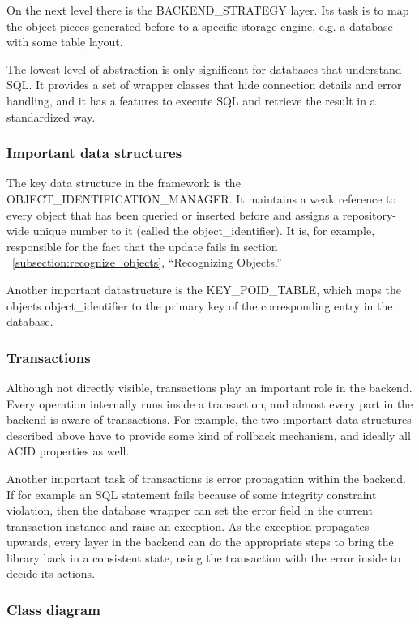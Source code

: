 On the next level there is the BACKEND\_STRATEGY layer.
Its task is to map the object pieces generated before to a specific storage engine, e.g. a database with some table layout.

The lowest level of abstraction is only significant for databases that understand SQL. 
It provides a set of wrapper classes that hide connection details and error handling, and it has a features to execute SQL and retrieve the result in a standardized way.

\subsubsection{Important data structures}

The key data structure in the framework is the OBJECT\_\-IDENTIFICA\-TION\_MANAGER.
It maintains a weak reference to every object that has been queried or inserted before and assigns a repository-wide unique number to it (called the object\_identifier).
It is, for example, responsible for the fact that the update fails in section ~\ref{subsection:recognize_objects}, ``Recognizing Objects.''

Another important datastructure is the KEY\_POID\_TABLE, which maps the objects object\_identifier to the primary key of the corresponding entry in the database.

\subsubsection{Transactions}

Although not directly visible, transactions play an important role in the backend.
Every operation internally runs inside a transaction, and almost every part in the backend is aware of transactions.
For example, the two important data structures described above have to provide some kind of rollback mechanism, and ideally all ACID  properties as well.

Another important task of transactions is error propagation within the backend.
If for example an SQL statement fails because of some integrity constraint violation, then the database wrapper can set the error field in the current transaction instance and raise an exception.
As the exception propagates upwards, every layer in the backend can do the appropriate steps to bring the library back in a consistent state, using the transaction with the error inside to decide its actions.

\subsubsection{Class diagram}

